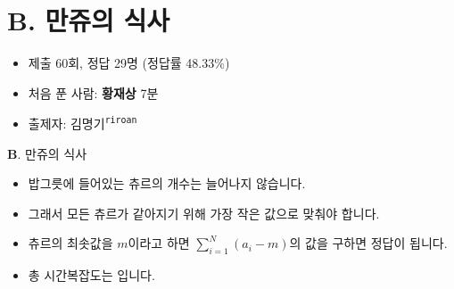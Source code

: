 \section{B. 만쥬의 식사}

\begin{frame} %
    \begin{itemize}
    	\item 제출 60회, 정답 29명 (정답률 48.33\%)
      	\item 처음 푼 사람: \textbf{황재상} 7분
        \item 출제자: 김명기\textsuperscript{\color{kupc-gray}\texttt{riroan}}
    \end{itemize}
\end{frame}

\begin{frame}{\textbf{B}. 만쥬의 식사}
    \begin{itemize}
        \item 밥그릇에 들어있는 츄르의 개수는 늘어나지 않습니다.
        \item 그래서 모든 츄르가 같아지기 위해 가장 작은 값으로 맞춰야 합니다.
        \item 츄르의 최솟값을 $m$이라고 하면 $\sum_{i=1}^N (a_i - m)$의 값을 구하면 정답이 됩니다.
		\item 총 시간복잡도는 입니다.
    \end{itemize}
\end{frame}